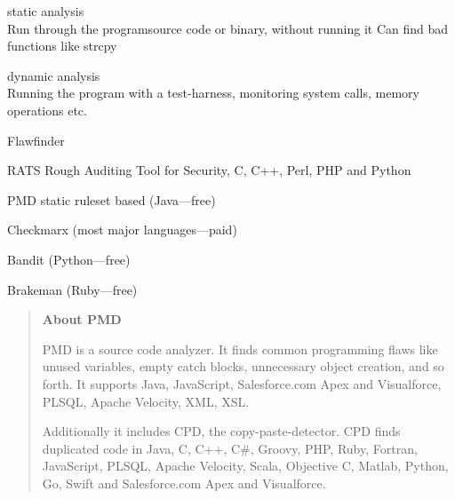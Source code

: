 \documentclass[Screen16to9,17pt]{foils}
\begin{document}
\begin{list1}
\item  {\Large static analysis}\\
Run through the programsource  code or binary, without running it
Can find bad functions like strcpy

\item {\Large dynamic analysis }\\
Running the program with a test-harness, monitoring system calls, memory operations etc.
\end{list1}

\begin{list1}
\item Flawfinder 
\item RATS Rough Auditing Tool for Security, C, C++, Perl, PHP and Python
\item PMD static ruleset based (Java—free)
\item Checkmarx (most major languages—paid)
\item Bandit (Python—free)
\item Brakeman (Ruby—free)

\item {\small {}}
\end{list1}


\begin{quote}{\bf
About PMD}

PMD is a source code analyzer. It finds common programming flaws like unused variables, empty catch blocks, unnecessary object creation, and so forth. It supports Java, JavaScript, Salesforce.com Apex and Visualforce, PLSQL, Apache Velocity, XML, XSL.

Additionally it includes CPD, the copy-paste-detector. CPD finds duplicated code in Java, C, C++, C\#, Groovy, PHP, Ruby, Fortran, JavaScript, PLSQL, Apache Velocity, Scala, Objective C, Matlab, Python, Go, Swift and Salesforce.com Apex and Visualforce.
\end{quote}

\begin{list1}
\item {}
\end{list1}


\end{document}
